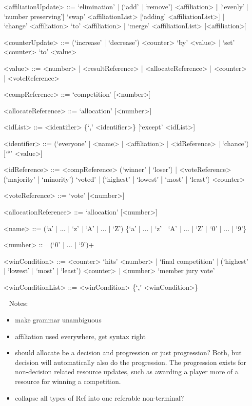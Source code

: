 \documentclass{article}
\begin{document}
\begin{grammar}
<affiliationUpdate> ::= `elimination' | (`add' | `remove') <affiliation> | 
[`evenly' | `number preserving'] `swap' <affiliationList> [`adding' 
<affiliationList>] | `change' <affiliation> `to' <affiliation> | `merge' 
<affiliationList> [<affiliation>]

<counterUpdate> ::= (`increase' | `decrease') <counter> `by' <value> | `set' 
<counter> `to' <value> 

<value> ::= <number> | <resultReference> | <allocateReference> | <counter> | 
<voteReference>

<compReference> ::= `competition' [<number>] 

<allocateReference> ::= `allocation' [<number>]

<idList> ::= <identifier> \{`,' <identifier>\} [`except' <idList>]

<identifier> ::= (`everyone' | <name> | <affiliation> | <idReference> | 
`chance') [`*' <value>]

<idReference> ::= <compReference> (`winner' | `loser') | <voteReference> 
(`majority' | `minority') `voted' | (`highest' | `lowest' | `most' | `least') 
<counter> 

<voteReference> ::= `vote' [<number>]

<allocationReference> ::= `allocation' [<number>]

<name> ::= (`a' | ... | `z' | `A' | ... | `Z') \{`a' | ... | `z' | `A' | ... | 
`Z' | `0' | ... | `9'\}

<number> ::= (`0' | ... | `9')+

<winCondition> ::= <counter> `hits' <number> | `final competition' | (`highest' 
| `lowest' | `most' | `least') <counter> | <number> `member jury vote'

<winConditionList> ::= <winCondition> \{`,' <winCondition>\}

\end{grammar}

~\newline
Notes:
\begin{itemize}
	\item make grammar unambiguous
	\item affiliation used everywhere, get syntax right
	\item should allocate be a decision and progression or just progression? 
	Both, but decision will automatically also do the progression. The 
	progression exists for non-decision related resource updates, such as 
	awarding a player more of a resource for winning a competition.
	\item collapse all types of Ref into one referable non-terminal? 
\end{itemize}
\end{document}
